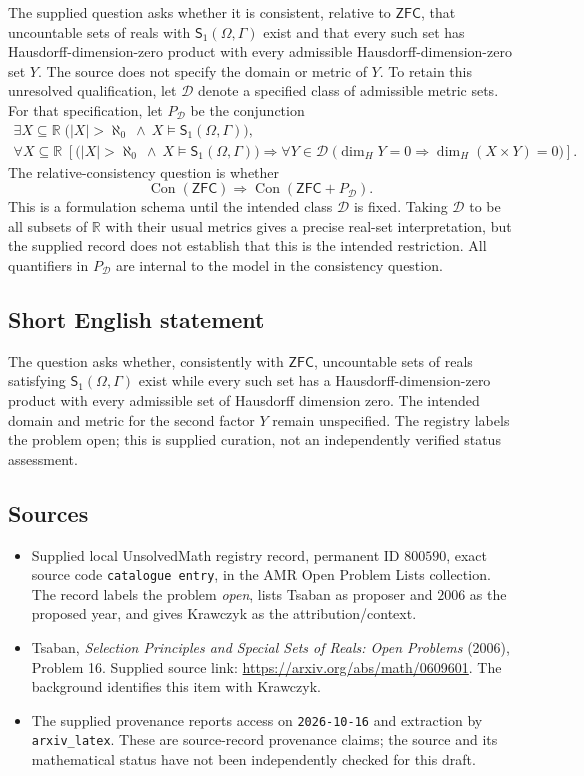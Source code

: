\documentclass[11pt]{article}
\newcommand{\R}{\mathbb{R}}
\begin{document}
The supplied question asks whether it is consistent, relative to \(\mathsf{ZFC}\), that uncountable sets of reals with \(\mathsf S_1(\Omega,\Gamma)\) exist and that every such set has Hausdorff-dimension-zero product with every admissible Hausdorff-dimension-zero set \(Y\). The source does not specify the domain or metric of \(Y\). To retain this unresolved qualification, let \(\mathcal D\) denote a specified class of admissible metric sets. For that specification, let \(P_{\mathcal D}\) be the conjunction
\[
\begin{gathered}
\exists X\subseteq\R\;\bigl(|X|>\aleph_0\ \land\ X\models\mathsf S_1(\Omega,\Gamma)\bigr),\\
\forall X\subseteq\R\;\left[
\bigl(|X|>\aleph_0\ \land\ X\models\mathsf S_1(\Omega,\Gamma)\bigr)
\Longrightarrow
\forall Y\in\mathcal D\;\bigl(\dim_H Y=0\Longrightarrow\dim_H(X\times Y)=0\bigr)
\right].
\end{gathered}
\]
The relative-consistency question is whether
\[
\operatorname{Con}(\mathsf{ZFC})\Longrightarrow
\operatorname{Con}(\mathsf{ZFC}+P_{\mathcal D}).
\]
This is a formulation schema until the intended class \(\mathcal D\) is fixed. Taking \(\mathcal D\) to be all subsets of \(\R\) with their usual metrics gives a precise real-set interpretation, but the supplied record does not establish that this is the intended restriction. All quantifiers in \(P_{\mathcal D}\) are internal to the model in the consistency question.
\subsection{Short English statement}
The question asks whether, consistently with \(\mathsf{ZFC}\), uncountable sets of reals satisfying \(\mathsf S_1(\Omega,\Gamma)\) exist while every such set has a Hausdorff-dimension-zero product with every admissible set of Hausdorff dimension zero. The intended domain and metric for the second factor \(Y\) remain unspecified. The registry labels the problem open; this is supplied curation, not an independently verified status assessment.
\subsection{Sources}
\begin{itemize}
\item Supplied local UnsolvedMath registry record, permanent ID \(800590\), exact source code \texttt{catalogue entry}, in the AMR Open Problem Lists collection. The record labels the problem \emph{open}, lists Tsaban as proposer and \(2006\) as the proposed year, and gives Krawczyk as the attribution/context.
\item Tsaban, \emph{Selection Principles and Special Sets of Reals: Open Problems} (2006), Problem 16. Supplied source link: \url{https://arxiv.org/abs/math/0609601}. The background identifies this item with Krawczyk.
\item The supplied provenance reports access on \texttt{2026-10-16} and extraction by \texttt{arxiv\_latex}. These are source-record provenance claims; the source and its mathematical status have not been independently checked for this draft.
\end{itemize}
\end{document}

